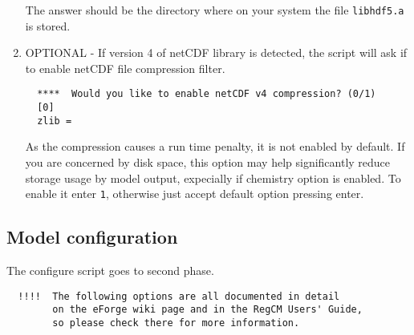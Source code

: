 \begin{enumerate}
The answer should be the directory where on your system the file
\verb=libhdf5.a= is stored.
\item OPTIONAL - If version 4 of netCDF library is detected, the script
will ask if to enable netCDF file compression filter.
\begin{Verbatim}
  ****  Would you like to enable netCDF v4 compression? (0/1)
  [0]
  zlib =
\end{Verbatim}
As the compression causes a run time penalty, it is not enabled by
default. If you are concerned by disk space, this option may help
significantly reduce storage usage by model output, expecially if
chemistry option is enabled. To enable it enter \verb=1=, otherwise
just accept default option pressing enter.
\end{enumerate}

\subsection{Model configuration}
\label{modconf}

The configure script goes to second phase.

\begin{Verbatim}
  !!!!  The following options are all documented in detail 
        on the eForge wiki page and in the RegCM Users' Guide,
        so please check there for more information.
\end{Verbatim}

